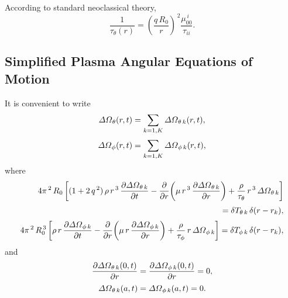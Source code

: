 \documentclass[12pt]{article}
\begin{document}
 According to 
standard neoclassical theory, 
\begin{equation}\label{c7}
\frac{1}{\tau_\theta(r)} = \left(\frac{q\,R_0}{r}\right)^{\,2}
\frac{\mu_{00}^{\,i}}{\tau_{ii}}.
\end{equation}

\subsection{Simplified Plasma Angular Equations of Motion}
It is convenient to write
\begin{align}
{\mit\Delta\Omega}_\theta(r,t) &= \sum_{k=1,K} {\mit\Delta\Omega}_{\theta\,k}(r,t),\\[0.5ex]
{\mit\Delta\Omega}_\phi(r,t) &= \sum_{k=1,K} {\mit\Delta\Omega}_{\phi\,k}(r,t),
\end{align}
where 
\begin{align}\label{e84}
 4\pi^{\,2}\,R_0\left[(1+2\,q^{\,2})\,\rho\,r^{\,3}\,\frac{\partial{\mit\Delta\Omega}_{\theta\,k}}{\partial t}-\frac{\partial}{\partial r}\!\left(
\mu\,r^{\,3}\,\frac{\partial{\mit\Delta\Omega}_{\theta\,k}}{\partial r}\right) +\frac{\rho}{\tau_{\theta}}\,r^{\,3}\,{\mit\Delta\Omega}_{\theta\,k}\right]\nonumber\\[0.5ex]\phantom{==}=\delta T_{\theta\,k}\,\delta (r-r_k),\\[0.5ex]
 4\pi^{\,2}\,R_0^{\,3}\left[\rho\,r\,\frac{\partial{\mit\Delta\Omega}_{\phi\,k}}{\partial t}-\frac{\partial}{\partial r}\!\left(
\mu\,r\,\frac{\partial{\mit\Delta\Omega}_{\phi\,k}}{\partial r}\right) +\frac{\rho}{\tau_{\phi}}\,r\,{\mit\Delta\Omega}_{\phi\,k}\right]
= \delta T_{\phi\,k}\,\delta(r-r_k),\label{e85}
\end{align}
and 
\begin{align}
\frac{\partial{\mit\Delta\Omega}_{\theta\,k}(0,t)}{\partial r} &=
\frac{\partial{\mit\Delta\Omega}_{\phi\,k}(0,t)}{\partial r} =0,\\[0.5ex]
{\mit\Delta\Omega}_{\theta\,k}(a,t)&={\mit\Delta\Omega}_{\phi\,k}(a,t)=0.
\end{align}
\end{document}
